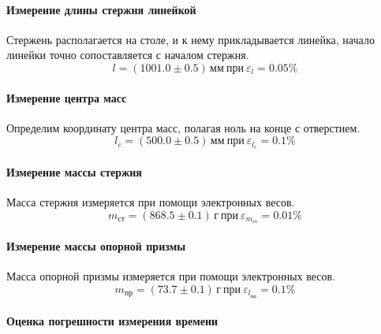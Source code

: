 \documentclass[12pt,a4paper]{scrartcl}
\begin{document}
	\paragraph{Измерение длины стержня линейкой} \hfill
	
	\par Стержень располагается на столе, и к нему прикладывается линейка, начало линейки точно сопоставляется с началом стержня.
	$$l = (1001.0 \pm 0.5)\,\text{мм}\ \text{при}\ \varepsilon_l = 0.05\%$$
	
	\paragraph{Измерение центра масс} \hfill
	
	\par Определим координату центра масс, полагая ноль на конце с отверстием.
	$$l_c = (500.0 \pm 0.5)\,\text{мм}\ \text{при}\ \varepsilon_{l_c} = 0.1\%$$
	
	\paragraph{Измерение массы стержня} \hfill
	
	\par Масса стержня измеряется при помощи электронных весов.
	$$m_{\text{ст}} = (868.5 \pm 0.1)\,\text{г}\ \text{при}\ \varepsilon_{m_{\text{ст}}} = 0.01\%$$
	
	\paragraph{Измерение массы опорной призмы} \hfill
	
	\par Масса опорной призмы измеряется при помощи электронных весов.
	$$m_{\text{пр}} = (73.7 \pm 0.1)\,\text{г}\ \text{при}\ \varepsilon_{l_{пр}} = 0.1\%$$
	
	\paragraph{Оценка погрешности измерения времени} \hfill
	
\end{document}
